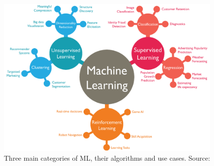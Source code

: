 \begin{figure} %
    \centering
    \includegraphics[width=.75\linewidth]{images/machine-learning.png}
    \caption{Three main categories of ML, their algorithms and use cases. Source: \cite{shewan_10_nodate}}
    \label{fig:machine_learning_structure}
\end{figure}

